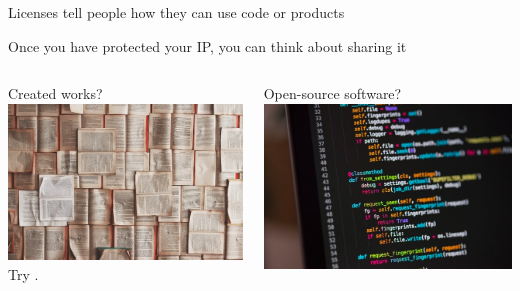 \begin{frame}{Licenses tell people how they can use code or products}

Once you have protected your IP, you can think about sharing it

\vfill

\begin{columns}[c]

    \begin{column}{0.45\textwidth}
        \begin{block}{Created works?}
        \includegraphics[trim=0 0 40 127, clip, width=\textwidth]{images/patrick-tomasso-Oaqk7qqNh_c-unsplash.jpg}\\
        Try .
        \end{block}
    \end{column}
    
    \begin{column}{0.45\textwidth}
        \begin{block}{Open-source software?}
        \includegraphics[trim=0 0 40 127, clip, width=\textwidth]{images/chris-ried-ieic5Tq8YMk-unsplash.jpg}
        

\end{block}
\end{column}
\end{columns}
\end{frame}
